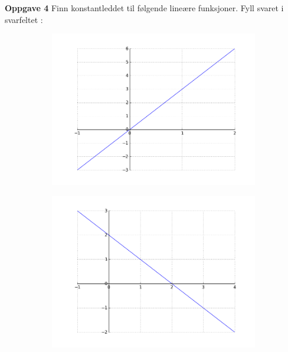 \documentclass[12pt,twoside,onecolumn]{article}
\begin{document}
\begin{Exercise}
\hspace{-6mm}\textbf{Oppgave 4} \newline
Finn konstantleddet til følgende lineære funksjoner. Fyll svaret i svarfeltet :
\begin{figure}[h!]
\centering
    \begin{subfigure}{.5\textwidth}
    \centering
    \includegraphics[scale = 0.5]{figures/3X.png}
    \end{subfigure}%
    \begin{subfigure}{.5\textwidth}
    \centering
    \includegraphics[scale = 0.5]{figures/mXp2.png}
    \end{subfigure}
    \begin{subfigure}{.5\textwidth}

\end{subfigure}
\end{figure}
\end{Exercise}
\end{document}

